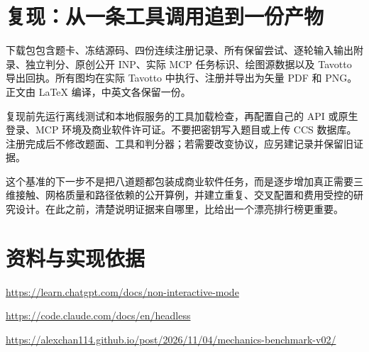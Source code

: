 \documentclass[11pt,a4paper]{ctexart}
\begin{document}
\section{复现：从一条工具调用追到一份产物}

下载包包含题卡、冻结源码、四份连续注册记录、所有保留尝试、逐轮输入输出附录、独立判分、原创公开 INP、实际 MCP 任务标识、绘图源数据以及 Tavotto 导出回执。所有图均在实际 Tavotto 中执行、注册并导出为矢量 PDF 和 PNG。正文由 LaTeX 编译，中英文各保留一份。

\par

复现前先运行离线测试和本地假服务的工具加载检查，再配置自己的 API 或原生登录、MCP 环境及商业软件许可证。不要把密钥写入题目或上传 CCS 数据库。注册完成后不修改题面、工具和判分器；若需要改变协议，应另建记录并保留旧证据。

\par

这个基准的下一步不是把八道题都包装成商业软件任务，而是逐步增加真正需要三维接触、网格质量和路径依赖的公开算例，并建立重复、交叉配置和费用受控的研究设计。在此之前，清楚说明证据来自哪里，比给出一个漂亮排行榜更重要。

\par

\section{资料与实现依据}

\url{https://learn.chatgpt.com/docs/non-interactive-mode}\par

\url{https://code.claude.com/docs/en/headless}\par

\url{https://alexchan114.github.io/post/2026/11/04/mechanics-benchmark-v02/}\par
\end{document}
